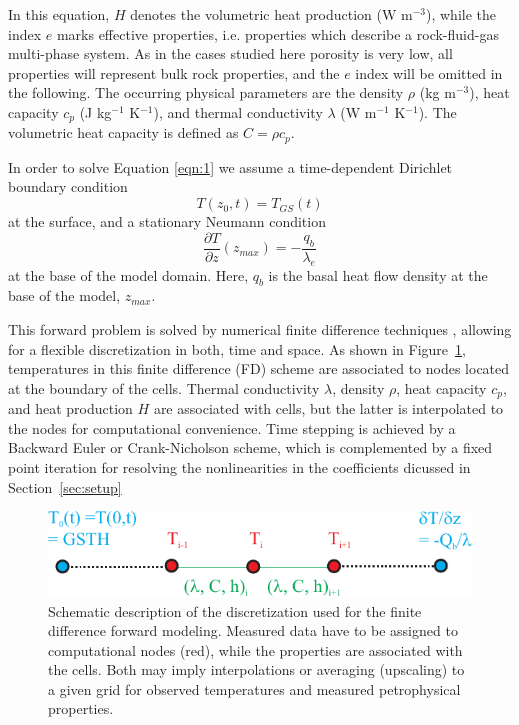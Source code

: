 \documentclass[cp]{copernicus}
\begin{document}
In this equation, $H$ denotes the volumetric heat production (W m$^{-3}$), while the index $e$ 
marks effective properties, i.e. properties which describe a rock-fluid-gas multi-phase system. As 
in the cases studied here porosity is very low, all properties will represent bulk rock properties, 
and the $e$ index will be omitted in the following. The occurring physical parameters are the 
density $\rho$ (kg m$^{-3}$), heat capacity $c_p$ (J kg$^{-1}$ K$^{-1}$), and thermal conductivity 
$\lambda$ (W m$^{-1}$ K$^{-1}$). The volumetric heat capacity is defined as $C = \rho c_p$. 

In order to solve Equation \ref{eqn:1} we assume a time-dependent Dirichlet boundary condition 
\begin{equation}\label{eqn:3a} 
T(z_0,t)=T_{GS}(t)
\end{equation} 
\noindent at the surface, and a stationary Neumann condition
\begin{equation}\label{eqn:3b}
\frac{\partial T}{\partial z}(z_{max }) =  - \frac{q_b}{\lambda_e}
\end{equation} 
\noindent at the base of the model domain. Here, $q_b$ is the basal heat flow density at the base 
 of the model, $z_{max}$. 
 
This forward problem is solved by numerical finite difference techniques 
\cite[e.g.,][]{Patankar1980a}, allowing for a flexible discretization in both, time and space. As 
shown in Figure~\ref{fig:FD}, temperatures in this finite difference (FD) scheme are associated 
to nodes located at the boundary of the cells. Thermal conductivity $\lambda$, density  $\rho$, 
heat capacity $c_p$, and heat production $H$ are associated with cells, but the latter is 
interpolated to the nodes for computational convenience. Time stepping is achieved by a Backward 
Euler or Crank-Nicholson scheme, which is complemented by a fixed point iteration for resolving the 
nonlinearities in the coefficients dicussed in Section~\ref{sec:setup}


\begin{figure}[htp]
 \centering
 \includegraphics[width=\columnwidth]{Figures/FDScheme}
 \caption[Schematic description of the finite difference discretization.]{Schematic description of 
the discretization used for 
the finite difference forward modeling. Measured data have to be assigned to 
computational nodes (red), while the properties are associated with the cells. 
Both may imply interpolations or averaging (upscaling) to a given grid for 
observed temperatures and measured petrophysical properties.}
\label{fig:FD}
\end{figure}
\end{document}
